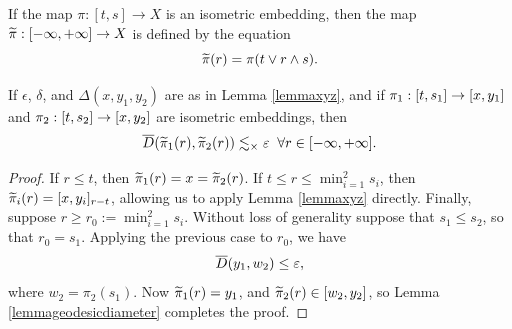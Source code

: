 
\begin{notation}
\label{notationwpi}
If the map $\pi:[t,s]\to X$ is an isometric embedding, then the map $\widetilde\pi:[-\infty,+\infty]\to X$ is defined by the equation
\[
\widetilde\pi(r) = \pi(t\vee r\wedge s).
\]
\end{notation}

\begin{corollary}
\label{corollaryxyz}
If $\epsilon$, $\delta$, and $\Delta(x,y_1,y_2)$ are as in Lemma \ref{lemmaxyz}, and if $\pi_1:[t,s_1]\to [x,y_1]$ and $\pi_2:[t,s_2]\to[x,y_2]$ are isometric embeddings, then
\[
\overline{D}(\widetilde\pi_1(r),\widetilde\pi_2(r)) \lesssim_\times \varepsilon \;\;\forall r\in [-\infty,+\infty].
\]
\end{corollary}
\begin{proof}
If $r\leq t$, then $\widetilde\pi_1(r) = x = \widetilde\pi_2(r)$. If $t\leq r \leq \min_{i = 1}^2 s_i$, then $\widetilde\pi_i(r) = [x,y_i]_{r - t}$, allowing us to apply Lemma \ref{lemmaxyz} directly. Finally, suppose $r\geq r_0 := \min_{i = 1}^2 s_i$. Without loss of generality suppose that $s_1 \leq s_2$, so that $r_0 = s_1$. Applying the previous case to $r_0$, we have
\[
\overline{D}(y_1,w_2) \leq \varepsilon,
\]
where $w_2 = \pi_2(s_1)$. Now $\widetilde\pi_1(r) = y_1$, and $\widetilde\pi_2(r)\in[w_2,y_2]$, so Lemma \ref{lemmageodesicdiameter} completes the proof.
\end{proof}

